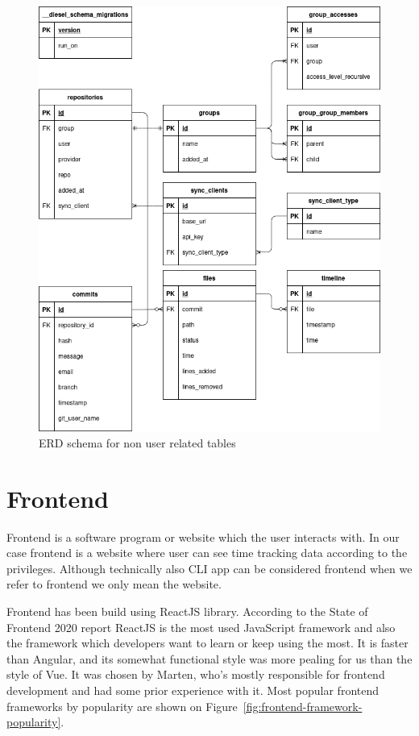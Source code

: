 \begin{figure}[H]
    \includegraphics[width=\textwidth]{figures/erd_schema_general}
    \caption{ERD schema for non user related tables}
    \label{fig:erd-schema-general}
\end{figure}

\section{Frontend}\label{sec:frontend}
Frontend is a software program or website which the user interacts with.
In our case frontend is a website where user can see time tracking data according to the privileges.
Although technically also CLI app can be considered frontend when we refer to frontend we only mean the website.

Frontend has been build using ReactJS library.
According to the State of Frontend 2020 report ReactJS is the most used JavaScript framework and also the framework which developers want to learn or keep using the most.
It is faster than Angular, and its somewhat functional style was more pealing for us than the style of Vue.
It was chosen by Marten, who's mostly responsible for frontend development and had some prior experience with it.
Most popular frontend frameworks by popularity are shown on Figure~\ref{fig:frontend-framework-popularity}.

